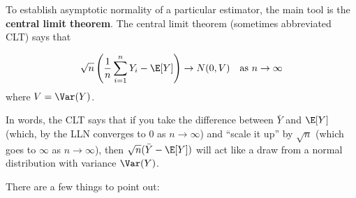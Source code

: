 \documentclass[
  letterpaper,
  DIV=11,
  numbers=noendperiod]{scrreprt}
\begin{document}
To establish asymptotic normality of a particular estimator, the main
tool is the \textbf{central limit theorem}. The central limit theorem
(sometimes abbreviated CLT) says that

\[
  \sqrt{n}\left( \frac{1}{n} \sum_{i=1}^n Y_i - \E[Y]\right) \rightarrow N(0,V) \quad \textrm{as } n \rightarrow \infty
\] where \(V = \Var(Y)\).

In words, the CLT says that if you take the difference between
\(\bar{Y}\) and \(\E[Y]\) (which, by the LLN converges to 0 as
\(n \rightarrow \infty\)) and ``scale it up'' by \(\sqrt{n}\) (which
goes to \(\infty\) as \(n \rightarrow \infty\)), then
\(\sqrt{n}(\bar{Y} - \E[Y])\) will act like a draw from a normal
distribution with variance \(\Var(Y)\).

There are a few things to point out:
\end{document}
